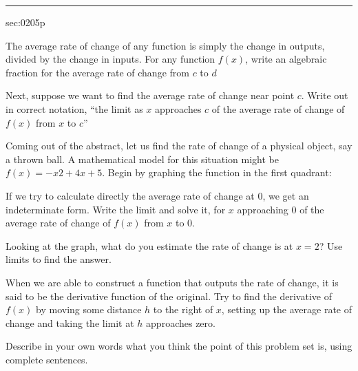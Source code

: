 \renewcommand{\columnseprule}{1.5pt}
\begin{multicols*}{2}
\rule[0.5\baselineskip]{0.4\textwidth}{1pt}
\noindent
{}\label{sec:0205p}
\begin{exercises}{sec:0205p}

\lab{} The average rate of change of any function is simply the change in outputs, divided by the change in inputs.  For any function $f(x)$, write an algebraic fraction for the average rate of change from $c$ to $d$

\vspace{3cm}
\lab{} Next, suppose we want to find the average rate of change near point $c$.  Write out in correct notation, ``the limit as $x$ approaches $c$ of the average rate of change of $f(x)$ from $x$ to $c$''


\vspace{3cm}
\lab{} Coming out of the abstract, let us find the rate of change of a physical object, say a thrown ball.  A mathematical model for this situation might be $f(x)=-x2+4x+5$.  Begin by graphing the function in the first quadrant:

\noindent
{}

\vspace{2cm}

\lab{}  If we try to calculate directly the average rate of change at 0, we get an indeterminate form.  Write the limit and solve it, for $x$ approaching 0 of the average rate of change of $f(x)$ from $x$ to 0.


\vspace{3cm}
\lab{} Looking at the graph, what do you estimate the rate of change is at $x=2$?  Use limits to find the answer.


\vspace{3cm}
\lab{}   When we are able to construct a function that outputs the rate of change, it is said to be the derivative function of the original.  Try to find the derivative of $f(x)$ by moving some distance $h$ to the right of $x$, setting up the average rate of change and taking the limit at $h$ approaches zero.


\vspace{5cm}
\lab{}  Describe in your own words what you think the point of this problem set is, using complete sentences.

\end{exercises}
\end{multicols*}